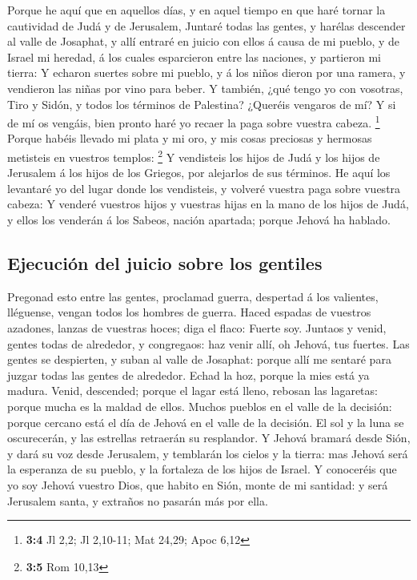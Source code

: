  Porque he aquí que en aquellos días, y en aquel tiempo en
que haré tornar la cautividad de Judá y de Jerusalem, 
Juntaré todas las gentes, y harélas descender al valle de Josaphat, y
allí entraré en juicio con ellos á causa de mi pueblo, y de Israel mi
heredad, á los cuales esparcieron entre las naciones, y partieron mi
tierra:  Y echaron suertes sobre mi pueblo, y á los niños
dieron por una ramera, y vendieron las niñas por vino para beber.
 Y también, ¿qué tengo yo con vosotras, Tiro y Sidón, y
todos los términos de Palestina? ¿Queréis vengaros de mí? Y si de mí os
vengáis, bien pronto haré yo recaer la paga sobre vuestra cabeza.
\footnote{\textbf{3:4} Jl 2,2; Jl 2,10-11; Mat 24,29; Apoc 6,12}
 Porque habéis llevado mi plata y mi oro, y mis cosas
preciosas y hermosas metisteis en vuestros templos: \footnote{\textbf{3:5}
  Rom 10,13}  Y vendisteis los hijos de Judá y los hijos
de Jerusalem á los hijos de los Griegos, por alejarlos de sus términos.
 He aquí los levantaré yo del lugar donde los vendisteis,
y volveré vuestra paga sobre vuestra cabeza:  Y venderé
vuestros hijos y vuestras hijas en la mano de los hijos de Judá, y ellos
los venderán á los Sabeos, nación apartada; porque Jehová ha hablado.

\hypertarget{ejecuciuxf3n-del-juicio-sobre-los-gentiles}{%
\subsection{Ejecución del juicio sobre los
gentiles}\label{ejecuciuxf3n-del-juicio-sobre-los-gentiles}}

 Pregonad esto entre las gentes, proclamad guerra,
despertad á los valientes, lléguense, vengan todos los hombres de
guerra.  Haced espadas de vuestros azadones, lanzas de
vuestras hoces; diga el flaco: Fuerte soy.  Juntaos y
venid, gentes todas de alrededor, y congregaos: haz venir allí, oh
Jehová, tus fuertes.  Las gentes se despierten, y suban
al valle de Josaphat: porque allí me sentaré para juzgar todas las
gentes de alrededor.  Echad la hoz, porque la mies está
ya madura. Venid, descended; porque el lagar está lleno, rebosan las
lagaretas: porque mucha es la maldad de ellos.  Muchos
pueblos en el valle de la decisión: porque cercano está el día de Jehová
en el valle de la decisión.  El sol y la luna se
oscurecerán, y las estrellas retraerán su resplandor.  Y
Jehová bramará desde Sión, y dará su voz desde Jerusalem, y temblarán
los cielos y la tierra: mas Jehová será la esperanza de su pueblo, y la
fortaleza de los hijos de Israel.  Y conoceréis que yo
soy Jehová vuestro Dios, que habito en Sión, monte de mi santidad: y
será Jerusalem santa, y extraños no pasarán más por ella.

